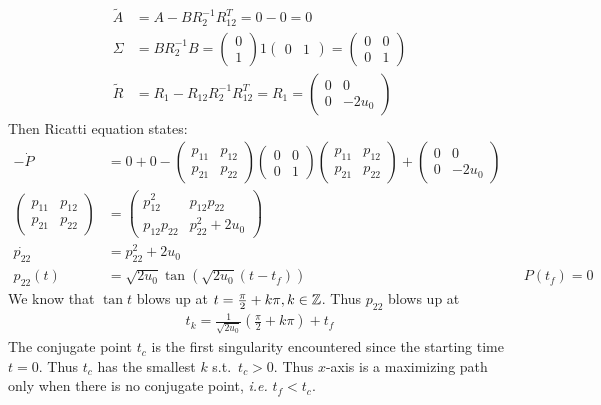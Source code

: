 \documentclass[12pt]{article}
\begin{document}
\begin{problem}[5]
\begin{enumerate}[label=(\alph*)]
 \begin{align*}
	 \widetilde{ A} &= A - BR_2^{-1}R_{12}^{T} = 0 -0=0\\
	 \Sigma &=  BR_2^{-1} B = \begin{pmatrix} 0\\1 \end{pmatrix} 1 \begin{pmatrix} 0&1 \end{pmatrix} = \begin{pmatrix} 0&0\\0&1 \end{pmatrix}  \\
	 \widetilde{ R} &= R_1 - R_{12}R_2^{-1}R_{12}^{T} = R_1 = \begin{pmatrix} 0&0\\0&-2u_0 \end{pmatrix}  
\end{align*}
Then Ricatti equation states:
\begin{align*}
	-\dot{P} &= 0+0- \begin{pmatrix} p_{11}&p_{12}\\p_{21}&p_{22} \end{pmatrix} \begin{pmatrix} 0&0\\0&1 \end{pmatrix} \begin{pmatrix} p_{11}&p_{12}\\p_{21}&p_{22} \end{pmatrix}  + \begin{pmatrix} 0&0\\0&-2u_0 \end{pmatrix} \\
	\begin{pmatrix} p_{11}&p_{12}\\p_{21}&p_{22} \end{pmatrix} &= \begin{pmatrix} p_{12}^2&p_{12}p_{22} \\p_{12}p_{22}&p_{22}^2+2u_0 \end{pmatrix}  \\ 
	\dot{p_{22}} &= p_{22}^2+2u_0\\
	p_{22}(t) &= \sqrt{2u_0} \tan \left( \sqrt{2u_0} (t-t_f) \right)   && P(t_f) =0
\end{align*}
We know that $ \tan t$ blows up at $ t = \frac{\pi}{ 2}+k \pi, k \in \mathbb{Z}$. Thus $ p_{22}$ blows up at
\begin{align*}
	t_k = \frac{1}{\sqrt{2u_0} } \left( \frac{\pi}{ 2}+k\pi \right) + t_f
\end{align*}
The conjugate point $ t_c$ is the first singularity encountered since the starting time $ t=0$. Thus  $ t_c$ has the smallest $k $ s.t.\ $ t_c >0$. Thus  $ x$-axis is a maximizing path only when there is no conjugate point,  \emph{i.e.} $ t_f<t_c$.
\end{enumerate}
\end{problem}
\end{document}

